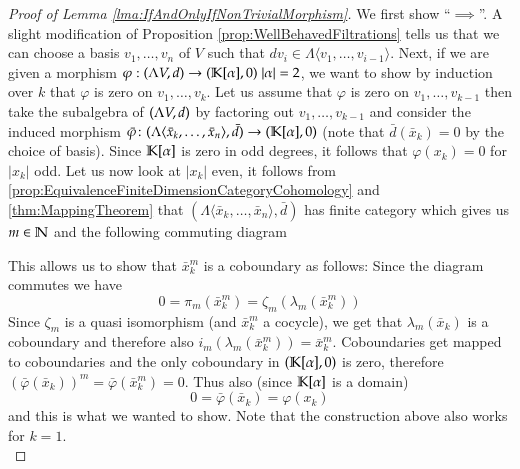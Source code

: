  \begin{proof}[Proof of Lemma \ref{lma:IfAndOnlyIfNonTrivialMorphism}]
 
  
  We first show ``$\implies$''. A slight modification of Proposition \ref{prop:WellBehavedFiltrations} tells us that we can 
  choose a basis $v_1, \ldots , v_n$ of $V$ such that $d v_i \in \Lambda \langle v_1, \ldots, v_{i-1} \rangle$.
  Next, if we are given a morphism  $ \varphi : (\Lambda V,d) \to (\mathbb{K}[\alpha],0) \; |\alpha| = 2 $, we want to show by induction over $k$ that
  $\varphi$ is zero on $v_1 , \ldots, v_k$. Let us assume that $\varphi$ is zero on $v_1, \ldots, v_{k-1}$ then take the
  subalgebra of $(\Lambda V,d)$ by factoring out $v_1, \ldots, v_{k-1}$ and consider the induced morphism 
  $\bar{\varphi} \colon (\Lambda \langle \bar{x}_k, \ldots, \bar{x}_n \rangle , \bar{d}) \to (\mathbb{K}[\alpha],0) $
  (note that $\bar{d}(\bar{x}_k) = 0$ by the  choice of basis). Since $\mathbb{K}[\alpha]$ is zero in odd degrees,
  it follows that $\varphi(x_k) = 0$ for $|x_k|$ odd. Let us now look at $|x_k|$ even,
  it follows from \ref{prop:EquivalenceFiniteDimensionCategoryCohomology} and \ref{thm:MappingTheorem} 
  that $(\Lambda \langle \bar{x}_k, \ldots, \bar{x}_n \rangle , \bar{d})$ has finite category which gives us  $m \in \mathbb{N}$ and the
  following commuting diagram
  
  \centerline {
  }
  This allows us to show that $\bar{x}_k^m$ is a coboundary as follows:
  Since the diagram commutes we have
  $$0 = \pi_m(\bar{x}_k^m) =   \zeta_m (\lambda_m (\bar{x}_k^m))$$ 
   Since $\zeta_m$ is a quasi isomorphism (and $\bar{x}_k^m$ a cocycle), we get that $\lambda_m (\bar{x}_k)$ is a coboundary and
  therefore also $ i_m (\lambda_m (\bar{x}_k^m)) = \bar{x}_k^m$. Coboundaries get mapped to coboundaries and the only coboundary
  in $(\mathbb{K}[\alpha], 0)$ is zero, therefore 
  $(\bar{\varphi}(\bar{x}_k))^m = \bar{\varphi}(\bar{x}_k^m) = 0$. Thus also (since $\mathbb{K}[\alpha]$ is a domain)
  $$ 0 = \bar{\varphi}(\bar{x}_k) = \varphi( x_k)$$
  and this is what we wanted to show. Note that the construction above also works for $k = 1$. \\
  

\end{proof}
